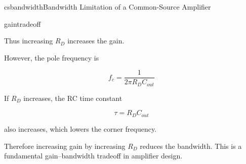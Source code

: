\begin{mainquestion}{csbandwidth}{Bandwidth Limitation of a Common-Source Amplifier}
\begin{partquestion}{gaintradeoff}
\begin{answer}[2in]
Thus increasing \(R_D\) increases the gain.

However, the pole frequency is

\[
f_c = \frac{1}{2\pi R_D C_{out}}
\]

If \(R_D\) increases, the RC time constant

\[
\tau = R_D C_{out}
\]

also increases, which lowers the corner frequency.

Therefore increasing gain by increasing \(R_D\) reduces the bandwidth.  
This is a fundamental gain–bandwidth tradeoff in amplifier design.
\end{answer}

\end{partquestion}

\end{mainquestion}
